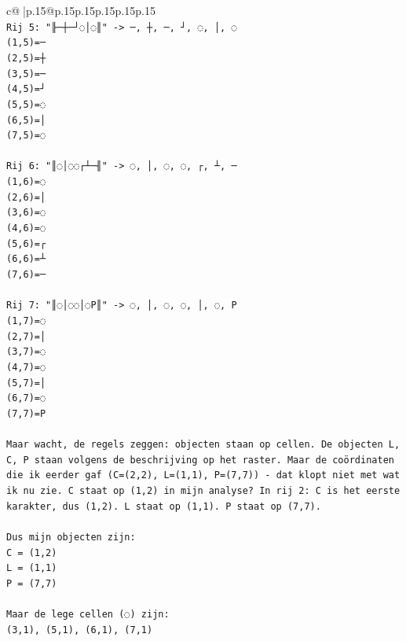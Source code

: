 \documentclass{article}
\begin{document}
{\begin{supertabular}{c@{$\;$}|p{.15\linewidth}@{}p{.15\linewidth}p{.15\linewidth}p{.15\linewidth}p{.15\linewidth}p{.15\linewidth}}
{{{\\ 
\texttt{Rij 5: "╟─┼─┘◌│◌║" {-}> ─, ┼, ─, ┘, ◌, │, ◌} \\
\texttt{(1,5)=─} \\
\texttt{(2,5)=┼} \\
\texttt{(3,5)=─} \\
\texttt{(4,5)=┘} \\
\texttt{(5,5)=◌} \\
\texttt{(6,5)=│} \\
\texttt{(7,5)=◌} \\
\\ 
\texttt{Rij 6: "║◌│◌◌┌┴─╢" {-}> ◌, │, ◌, ◌, ┌, ┴, ─} \\
\texttt{(1,6)=◌} \\
\texttt{(2,6)=│} \\
\texttt{(3,6)=◌} \\
\texttt{(4,6)=◌} \\
\texttt{(5,6)=┌} \\
\texttt{(6,6)=┴} \\
\texttt{(7,6)=─} \\
\\ 
\texttt{Rij 7: "║◌│◌◌│◌P║" {-}> ◌, │, ◌, ◌, │, ◌, P} \\
\texttt{(1,7)=◌} \\
\texttt{(2,7)=│} \\
\texttt{(3,7)=◌} \\
\texttt{(4,7)=◌} \\
\texttt{(5,7)=│} \\
\texttt{(6,7)=◌} \\
\texttt{(7,7)=P} \\
\\ 
\texttt{Maar wacht, de regels zeggen: objecten staan op cellen. De objecten L, C, P staan volgens de beschrijving op het raster. Maar de coördinaten die ik eerder gaf (C=(2,2), L=(1,1), P=(7,7)) {-} dat klopt niet met wat ik nu zie. C staat op (1,2) in mijn analyse? In rij 2: C is het eerste karakter, dus (1,2). L staat op (1,1). P staat op (7,7).} \\
\\ 
\texttt{Dus mijn objecten zijn:} \\
\texttt{C = (1,2)} \\
\texttt{L = (1,1)} \\
\texttt{P = (7,7)} \\
\\ 
\texttt{Maar de lege cellen (◌) zijn:} \\
\texttt{(3,1), (5,1), (6,1), (7,1)} \\
}}}
\end{supertabular}}
\end{document}
